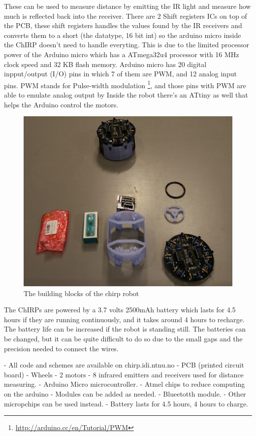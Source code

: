 These can be used to measure distance by emitting the IR light and measure how much is reflected back into the receiver. There are 2 Shift registers ICs on top of the PCB, these shift registers handles the values found by the IR receivers and converts them to a short (the datatype, 16 bit int) so the arduino micro inside the ChIRP doesn't need to handle everyting. This is due to the limited processor power of the Arduino micro which has a ATmega32u4 processor with 16 MHz clock speed and 32 KB flash memory. Arduino micro has 20 digital inpput/output (I/O) pins in which 7 of them are PWM, and 12 analog input pins. PWM stands for Pulse-width modulation \footnote{\href{http://arduino.cc/en/Tutorial/PWM}{http://arduino.cc/en/Tutorial/PWM}}, and those pins with PWM are able to emulate analog output by 
Inside the robot there's an ATtiny as well that helps the Arduino control the motors.  
\begin{figure}[H]
	\centering
	\includegraphics[width=0.8\linewidth]{images/chirpPieces}
	\caption[ChIRP pieces]{The building blocks of the chirp robot}
\end{figure}


The ChIRPs are powered by a 3.7 volts 2500mAh battery which lasts for 4.5 hours if they are running continuously, and it takes around 4 hours to recharge. The battery life can be increased if the robot is standing still. The batteries can be changed, but it can be quite difficult to do so due to the small gaps and the precision needed to connect the wires.

- All code and schemes are available on chirp.idi.ntnu.no
- PCB (printed circuit board)
- Wheels
- 2 motors
- 8 infrared emitters and receivers used for distance measuring.
- Arduino Micro microcontroller.
- Atmel chips to reduce computing on the arduino
- Modules can be added as needed.
- Blueetotth module.
- Other micropchips can be used instead.
- Battery lasts for 4.5 hours, 4 hours to charge.

